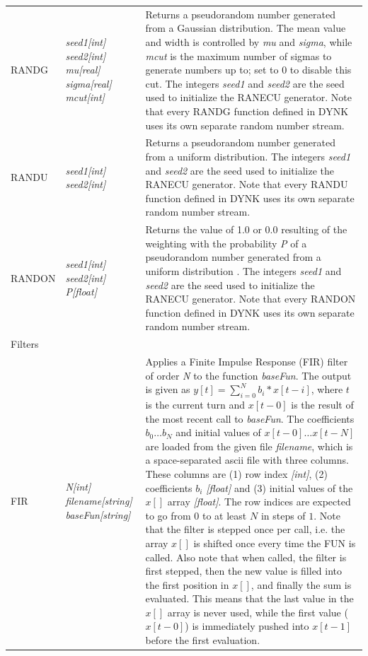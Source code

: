 \begin{center}
\begin{longtable}{|p{2.25cm} | p{4cm} p{9.5cm}|}
  RANDG      & \emph{seed1[int] seed2[int] mu[real] sigma[real] mcut[int]} &
  Returns a pseudorandom number generated from a Gaussian distribution.
  The mean value and width is controlled by \emph{mu} and \emph{sigma}, while \emph{mcut} is the maximum number of sigmas to generate numbers up to; set to 0 to disable this cut.
  The integers \emph{seed1} and \emph{seed2} are the seed used to initialize the RANECU generator.
  Note that every RANDG function defined in DYNK uses its own separate random number stream.\\

  RANDU      & \emph{seed1[int] seed2[int]} &
  Returns a pseudorandom number generated from a uniform distribution.
  The integers \emph{seed1} and \emph{seed2} are the seed used to initialize the RANECU generator.
  Note that every RANDU function defined in DYNK uses its own separate random number stream.\\
  
  RANDON      & \emph{seed1[int] seed2[int] P[float]} &
  Returns the value of 1.0 or 0.0 resulting of the weighting with the probability \emph{P} of a pseudorandom number generated from a uniform distribution .
  The integers \emph{seed1} and \emph{seed2} are the seed used to initialize the RANECU generator.
  Note that every RANDON function defined in DYNK uses its own separate random number stream.\\

  \hline
  \rowcolor{blue!15}
  Filters & & \\*
  
  FIR        & \emph{N[int] filename[string] baseFun[string]} &
  Applies a Finite Impulse Response (FIR) filter of order \emph{N} to the function \emph{baseFun}.
  The output is given as $y[t] = \sum_{i=0}^N b_i*x[t-i]$, where $t$ is the current turn and $x[t-0]$ is the result of the most recent call to \emph{baseFun}.
  The coefficients $b_0 \ldots b_N$ and initial values of $x[t-0]\ldots x[t-N]$ are loaded from the given file \emph{filename}, which is a space-separated ascii file with three columns.
  These columns are (1) row index \emph{[int]}, (2) coefficients $b_i$ \emph{[float]} and (3) initial values of the $x[]$ array \emph{[float]}.
  The row indices are expected to go from $0$ to at least $N$ in steps of $1$.
  Note that the filter is stepped once per call, i.e. the array $x[]$ is shifted once every time the FUN is called.
  Also note that when called, the filter is first stepped, then the new value is filled into the first position in $x[]$, and finally the sum is evaluated.
  This means that the last value in the $x[]$ array is never used, while the first value ($x[t-0]$) is immediately pushed into $x[t-1]$ before the first evaluation.\\*
  

\end{longtable}
\end{center}
